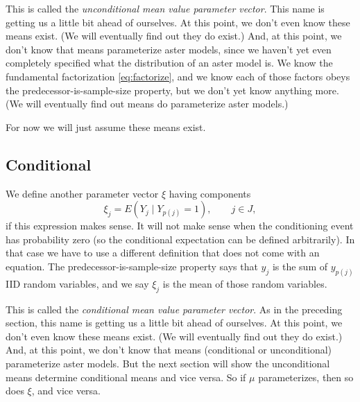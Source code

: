 This is called the \emph{unconditional mean value parameter vector}.
This name is getting us a little bit ahead of ourselves.
At this point, we don't even know these means exist.
(We will eventually find out they do exist.)
And, at this point, we don't know that means parameterize aster models,
since we haven't yet even completely specified what the distribution
of an aster model is.  We know the fundamental factorization
\eqref{eq:factorize}, and we know each of those factors obeys the
predecessor-is-sample-size property, but we don't yet know anything more.
(We will eventually find out means do parameterize aster models.)

For now we will just assume these means exist.

\subsection{Conditional}

We define another parameter vector $\xi$ having components
\begin{equation} \label{eq:conditional-mean-values}
   \xi_j = E(Y_j \mid Y_{p(j)} = 1), \qquad j \in J,
\end{equation}
if this expression makes sense.  It will not make sense when the
conditioning event has probability zero (so the conditional expectation
can be defined arbitrarily).  In that case we have to use a different
definition that does not come with an equation.
The predecessor-is-sample-size property says that $y_j$ is the sum
of $y_{p(j)}$ IID random variables, and we say $\xi_j$ is the mean
of those random variables.

This is called the \emph{conditional mean value parameter vector}.
As in the preceding section, this name is getting us a little bit ahead
of ourselves.
At this point, we don't even know these means exist.
(We will eventually find out they do exist.)
And, at this point, we don't know that means (conditional or unconditional)
parameterize aster models.  But the next section will show the unconditional
means determine conditional means and vice versa.  So if $\mu$ parameterizes,
then so does $\xi$, and vice versa.

